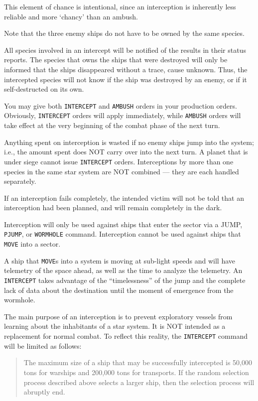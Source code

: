 \documentclass[10pt,titlepage]{article}
\begin{document}
This element of chance is intentional, since an interception is inherently less
reliable and more `chancy' than an ambush.

Note that the three enemy ships do not have to be owned by the same species.

All species involved in an intercept will be notified of the results in their
status reports.  The species that owns the ships that were destroyed will only
be informed that the ships disappeared without a trace, cause unknown.  Thus,
the intercepted species will not know if the ship was destroyed by an enemy,
or if it self-destructed on its own.

You may give both \texttt{INTERCEPT} and \texttt{AMBUSH} orders in your production orders. 
Obviously, \texttt{INTERCEPT} orders will apply immediately, while \texttt{AMBUSH} orders will
take effect at the very beginning of the combat phase of the next turn.

Anything spent on interception is wasted if no enemy ships jump into the
system; i.e., the amount spent does NOT carry over into the next turn.  A
planet that is under siege cannot issue \texttt{INTERCEPT} orders.  Interceptions by
more than one species in the same star system are NOT combined --- they are
each handled separately.

If an interception fails completely, the intended victim will not be told that
an interception had been planned, and will remain completely in the dark.

Interception will only be used against ships that enter the sector via a JUMP,
\texttt{PJUMP}, or \texttt{WORMHOLE} command.  Interception cannot be used against ships that
\texttt{MOVE} into a sector.

\begin{informationnote}
A ship that \texttt{MOVE}s into a system is moving at sub-light speeds and will have
telemetry of the space ahead, as well as the time to analyze the telemetry.
An \texttt{INTERCEPT} takes advantage of the ``timelessness'' of the jump and the complete
lack of data about the destination until the moment of emergence from the
wormhole. 
\end{informationnote}

The main purpose of an interception is to prevent exploratory vessels from
learning about the inhabitants of a star system.  It is NOT intended as
a replacement for normal combat.  To reflect this reality, the \texttt{INTERCEPT}
command will be limited as follows:

\begin{quotation}
	The maximum size of a ship that may be successfully intercepted
	is 50,000 tons for warships and 200,000 tons for transports.  If
	the random selection process described above selects a larger
	ship, then the selection process will abruptly end.\end{quotation} 
\end{document}
